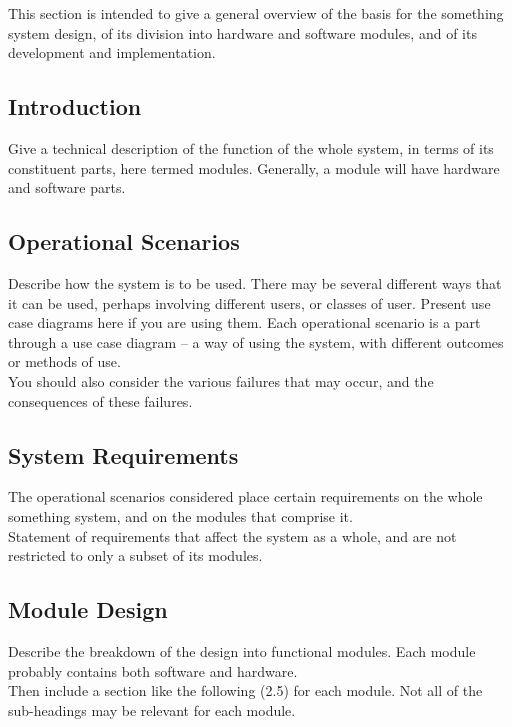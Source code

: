 \documentclass[MTRX3700report.tex]{subfiles}
\begin{document}
This section is intended to give a general overview of the basis for the something system design, of its division into hardware and software modules, and of its development and implementation.  
\subsection{Introduction}
Give a technical description of the function of the whole system, in terms of its constituent parts, here termed modules. Generally, a module will have hardware and software parts.
\subsection{Operational Scenarios}
Describe how the system is to be used. There may be several different ways that it can be used, perhaps involving different users, or classes of user. Present use case diagrams here if you are using them. Each operational scenario is a part through a use case diagram – a way of using the system, with different outcomes or methods of use. \\
You should also consider the various failures that may occur, and the consequences of these failures.

\subsection{System Requirements}
The operational scenarios considered place certain requirements on the whole something system, and on the modules that comprise it.\\
Statement of requirements that affect the system as a whole, and are not restricted to only a subset of its modules.

\subsection{Module Design}
Describe the breakdown of the design into functional modules. Each module probably contains both software and hardware.\\
Then include a section like the following (2.5) for each module. Not all of the sub-headings may be relevant for each module.
\end{document}
